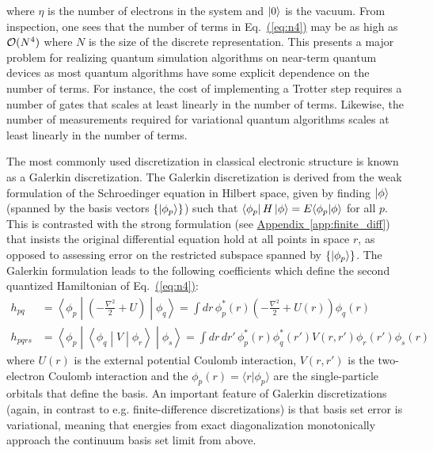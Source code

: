 \documentclass[superscriptaddress,aps,pra,nofootinbib,notitlepage,10pt,longbibliography]{revtex4-1}
\newcommand{\eq}[1]{Eq.~\hyperref[eq:#1]{(\ref*{eq:#1})}}
\DeclareRobustCommand{\app}[1]{\hyperref[app:#1]{Appendix~\ref*{app:#1}}}
\def\bra#1{\mathinner{\langle{#1}|}}
\def\ket#1{\mathinner{|{#1}\rangle}}
\newcommand{\braket}[2]{\langle #1|#2\rangle}
\begin{document}
where $\eta$ is the number of electrons in the system and $\ket{0}$ is the vacuum. From inspection, one sees that the number of terms in \eq{n4} may be as high as ${\cal O}(N^4)$ where $N$ is the size of the discrete representation. This presents a major problem for realizing quantum simulation algorithms on near-term quantum devices as most quantum algorithms have some explicit dependence on the number of terms. For instance, the cost of implementing a Trotter step requires a number of gates that scales at least linearly in the number of terms. Likewise, the number of measurements required for variational quantum algorithms scales at least linearly in the number of terms. 

The most commonly used discretization in classical electronic structure is known as a Galerkin discretization. The Galerkin discretization is derived from the weak formulation of the Schroedinger equation in Hilbert space, given by finding $\ket{\phi}$ (spanned by the basis vectors $\{\ket{\phi_p}\}$) such that $\bra{\phi_p}H\ket{\phi} = E \braket{\phi_p}{\phi}$ for all $p$. This is contrasted with the strong formulation (see \app{finite_diff}) that insists the original differential equation hold at all points in space $r$, as opposed to assessing error on the restricted subspace spanned by $\{\ket{\phi_p}\}$. The Galerkin formulation leads to the following coefficients which define the second quantized Hamiltonian of \eq{n4}:
\begin{align}
\label{eq:one_body_ints}
h_{pq} &= \left\langle \phi_p \middle | \left(-\frac{\nabla^2}{2} + U\right) \middle | \phi_q \right\rangle = \int dr \, \phi_p^* \left(r\right) \left(-\frac{\nabla^2}{2} + U\left(r\right)\right) \phi_q \left(r\right) \\
%
h_{pqrs} &= \left\langle \phi_p \middle |  \left \langle \phi_q \middle | V \middle | \phi_r\right\rangle \middle | \phi_s \right\rangle = \int dr \, dr' \,  \phi_p^*\left(r\right) \phi_q^* \left(r'\right) V\left(r, r'\right) \phi_r \left(r'\right)  \phi_s \left(r\right)
\label{eq:two_body_ints}
\end{align}
where $U(r)$ is the external potential Coulomb interaction, $V(r,r')$ is the two-electron Coulomb interaction and the $\phi_p(r)=\braket{r}{\phi_p}$ are the single-particle orbitals that define the basis. An important feature of Galerkin discretizations (again, in contrast to e.g. finite-difference discretizations) is that basis set error is variational, meaning that energies from exact diagonalization monotonically approach the continuum basis set limit from above.
 
\end{document}

